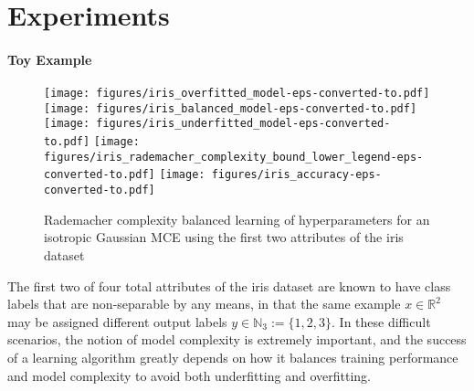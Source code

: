 \documentclass[runningheads, envcountsame, a4paper]{llncs}
\begin{document}
	\section{Experiments}
	\label{sec:experiments}
	
		\paragraph{Toy Example}
	
			\begin{figure*}[t]
				\centering
				\texttt{[image: figures/iris\_overfitted\_model-eps-converted-to.pdf]}
				\texttt{[image: figures/iris\_balanced\_model-eps-converted-to.pdf]}
				\texttt{[image: figures/iris\_underfitted\_model-eps-converted-to.pdf]}
				\texttt{[image: figures/iris\_rademacher\_complexity\_bound\_lower\_legend-eps-converted-to.pdf]}
				\texttt{[image: figures/iris\_accuracy-eps-converted-to.pdf]}
				\caption{Rademacher complexity balanced learning of hyperparameters for an isotropic Gaussian \gls{MCE} using the first two attributes of the iris dataset}
				\label{fig:iris}
			\end{figure*}
				
			The first two of four total attributes of the iris dataset \citep{fisher1936use} are known to have class labels that are non-separable by any means, in that the same example $x \in \mathbb{R}^{2}$ may be assigned different output labels $y \in \mathbb{N}_{3} := \{1, 2, 3\}$. In these difficult scenarios, the notion of model complexity is extremely important, and the success of a learning algorithm greatly depends on how it balances training performance and model complexity to avoid both underfitting and overfitting. 
			
\end{document}
